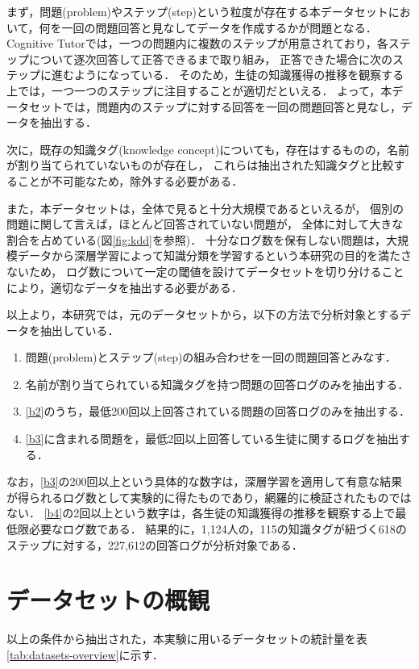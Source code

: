 まず，問題(problem)やステップ(step)という粒度が存在する本データセットにおいて，何を一回の問題回答と見なしてデータを作成するかが問題となる．
Cognitive Tutorでは，一つの問題内に複数のステップが用意されており，各ステップについて逐次回答して正答できるまで取り組み，
正答できた場合に次のステップに進むようになっている．
そのため，生徒の知識獲得の推移を観察する上では，一つ一つのステップに注目することが適切だといえる．
よって，本データセットでは，問題内のステップに対する回答を一回の問題回答と見なし，データを抽出する．

次に，既存の知識タグ(knowledge concept)についても，存在はするものの，名前が割り当てられていないものが存在し，
これらは抽出された知識タグと比較することが不可能なため，除外する必要がある．
 
また，本データセットは，全体で見ると十分大規模であるといえるが，
個別の問題に関して言えば，ほとんど回答されていない問題が，
全体に対して大きな割合を占めている(図\ref{fig:kdd}を参照)．
十分なログ数を保有しない問題は，大規模データから深層学習によって知識分類を学習するという本研究の目的を満たさないため，
ログ数について一定の閾値を設けてデータセットを切り分けることにより，適切なデータを抽出する必要がある．


以上より，本研究では，元のデータセットから，以下の方法で分析対象とするデータを抽出している．
\begin{enumerate}
	\item 問題(problem)とステップ(step)の組み合わせを一回の問題回答とみなす．\label{b1}
	\item 名前が割り当てられている知識タグを持つ問題の回答ログのみを抽出する．\label{b2}
	\item \ref{b2}のうち，最低200回以上回答されている問題の回答ログのみを抽出する．\label{b3}
	\item \ref{b3}に含まれる問題を，最低2回以上回答している生徒に関するログを抽出する．\label{b4}
\end{enumerate}

なお，\ref{b3}の200回以上という具体的な数字は，深層学習を適用して有意な結果が得られるログ数として実験的に得たものであり，網羅的に検証されたものではない．
\ref{b4}の2回以上という数字は，各生徒の知識獲得の推移を観察する上で最低限必要なログ数である．
結果的に，1,124人の，115の知識タグが紐づく618のステップに対する，227,612の回答ログが分析対象である．


\section{データセットの概観}
以上の条件から抽出された，本実験に用いるデータセットの統計量を表\ref{tab:datasets-overview}に示す．

